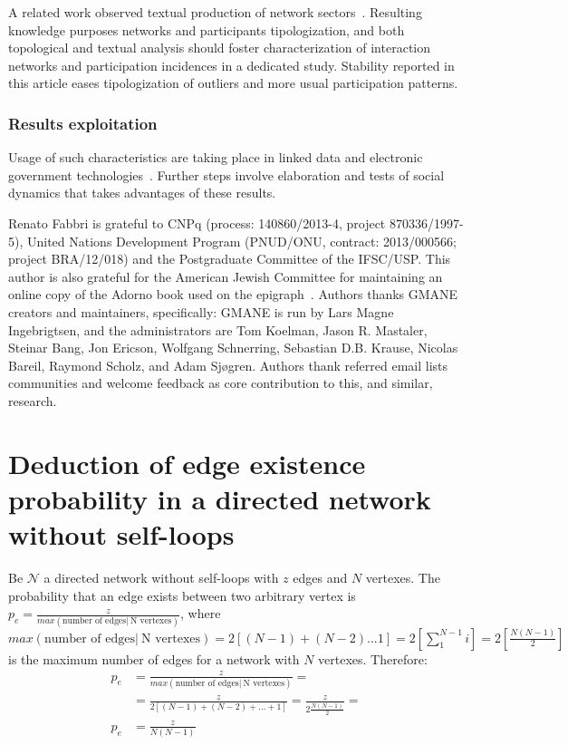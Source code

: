 \documentclass[%
 aip,
 jmp,%
 amsmath,amssymb,
 reprint,%
]{revtex4-1}
\begin{document}
A related work observed textual production of network sectors~\cite{rcText}. Resulting knowledge purposes networks and participants tipologization, and both topological and textual analysis should foster characterization of interaction networks and participation incidences in a dedicated study.
Stability reported in this article eases tipologization of outliers and more usual participation patterns.

        \subsubsection{Results exploitation}
Usage of such characteristics are taking place in linked data and electronic government technologies~\cite{ops,opa,ensaio}. Further steps involve elaboration and tests of social dynamics that takes advantages of these results.

\begin{acknowledgments}
Renato Fabbri is grateful to CNPq (process: 140860/2013-4,
project 870336/1997-5), United Nations Development Program (PNUD/ONU, contract: 2013/000566; project BRA/12/018)  and 
the Postgraduate Committee of the IFSC/USP. This author is also grateful for
the American Jewish Committee for maintaining an online copy of the Adorno book
used on the epigraph~\cite{adorno}. Authors thanks GMANE creators and maintainers, specifically: GMANE is run by Lars Magne Ingebrigtsen, and the administrators are Tom Koelman, Jason R. Mastaler, Steinar Bang, Jon Ericson, Wolfgang Schnerring, Sebastian D.B. Krause, Nicolas Bareil, Raymond Scholz, and Adam Sjøgren. Authors thank referred email lists communities and welcome feedback as core contribution to this, and similar, research.
\end{acknowledgments}


\appendix
\section{Deduction of edge existence probability in a directed network without self-loops}\label{ap:ded}
Be $\mathcal{N}$ a directed network without self-loops with $z$ edges and $N$ vertexes. The probability that an edge exists between two arbitrary vertex is $p_e=\frac{z}{max( \text{number of edges} |\ \text{N vertexes})}$, where $max( \text{number of edges} |\ \text{N vertexes})=2[(N-1)+(N-2)...1]=2[\sum_1^{N-1}i]=2[\frac{N(N-1)}{2}]$ is the maximum number of edges for a network with $N$ vertexes. Therefore:
\begin{align}
    p_e&=\frac{z}{max( \text{number of edges} |\ \text{N vertexes})}=\nonumber\\
       &=\frac{z}{2[(N-1)+(N-2)+...+1]}=\frac{z}{2\frac{N(N-1)}{2}}=\nonumber\\
   p_e &=\frac{z}{N(N-1)}
\end{align}
\end{document}

